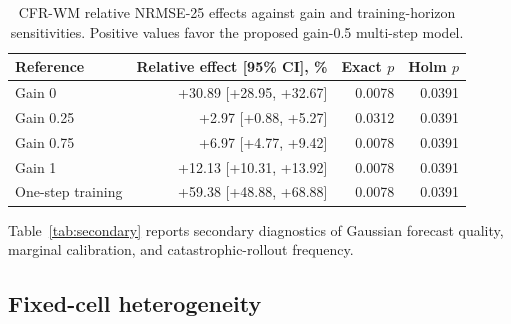 \documentclass[pdflatex,sn-basic]{sn-jnl}
\begin{document}
\begin{table}[t]
\centering
\caption{CFR-WM relative NRMSE-25 effects against gain and training-horizon
sensitivities. Positive values favor the proposed gain-0.5 multi-step model.}
\label{tab:sensitivity-contrasts}
\begin{tabular}{lrrr}
\toprule
Reference & Relative effect [95\% CI], \% & Exact $p$ & Holm $p$ \\
\midrule
Gain 0 & +30.89 [+28.95, +32.67] & 0.0078 & 0.0391 \\
Gain 0.25 & +2.97 [+0.88, +5.27] & 0.0312 & 0.0391 \\
Gain 0.75 & +6.97 [+4.77, +9.42] & 0.0078 & 0.0391 \\
Gain 1 & +12.13 [+10.31, +13.92] & 0.0078 & 0.0391 \\
One-step training & +59.38 [+48.88, +68.88] & 0.0078 & 0.0391 \\
\bottomrule
\end{tabular}
\end{table}

Table~\ref{tab:secondary} reports secondary diagnostics of Gaussian forecast
quality, marginal calibration, and catastrophic-rollout frequency.

\begin{table}[t]
\centering
\caption{Secondary aggregate diagnostics for the six broad methods. Rates and
scores are seed-balanced over all fixed cells and are not separately tested.}
\label{tab:secondary}
\end{table}

\subsection{Fixed-cell heterogeneity}
\end{document}
